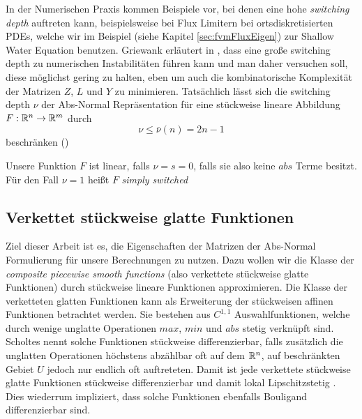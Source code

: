 In der Numerischen Praxis kommen Beispiele vor, bei denen eine hohe \textit{switching depth} auftreten kann, beispielsweise bei Flux Limitern bei ortsdiskretisierten PDEs, welche wir im Beispiel (siehe Kapitel \ref{sec:fvmFluxEigen}) zur Shallow Water Equation benutzen. Griewank erläutert in \cite{monster}, dass eine große switching depth zu numerischen Instabilitäten führen kann und man daher versuchen soll, diese möglichst gering zu halten, eben um auch die kombinatorische Komplexität der Matrizen $Z$, $L$ und $Y$ zu minimieren. Tatsächlich lässt sich die switching depth $\nu$ der Abs-Normal Repräsentation für eine stückweise lineare Abbildung $F:\mathbb{R}^n\to\mathbb{R}^m$ durch 
\[
\nu \leq \bar \nu(n) = 2n-1                                                                                                                                                                                                                                                                                                                                                                                                                                                                                                                                                                                                                                                            \]
beschränken (\cite[S.3]{plan})


Unsere Funktion $F$ ist linear, falls $\nu=s = 0$, falls sie also keine $abs$ Terme besitzt. Für den Fall $\nu=1$ heißt $F$ \textit{simply switched}
\subsection{Verkettet stückweise glatte Funktionen}
Ziel dieser Arbeit ist es, die Eigenschaften der Matrizen der Abs-Normal Formulierung für unsere Berechnungen zu nutzen.
Dazu wollen wir die Klasse der \textit{composite piecewise smooth functions} (also verkettete stückweise glatte Funktionen) durch stückweise lineare Funktionen approximieren.
Die Klasse der verketteten glatten Funktionen kann als Erweiterung der stückweisen affinen Funktionen betrachtet werden. Sie bestehen aus $C^{1,1}$ Auswahlfunktionen, welche durch wenige unglatte Operationen $max$, $min$ und $abs$ stetig verknüpft sind.
Scholtes nennt solche Funktionen stückweise differenzierbar, falls  zusätzlich die unglatten Operationen höchstens abzählbar oft auf dem $\mathbb{R}^n$, auf beschränkten Gebiet $U$ jedoch nur endlich oft auftreteten. Damit ist jede verkettete stückweise glatte Funktionen stückweise differenzierbar und damit lokal Lipschitzstetig \cite[Cor. 4.1.1.]{scholtes2012introduction}. Dies wiederrum impliziert, dass solche Funktionen ebenfalls Bouligand differenzierbar sind.

